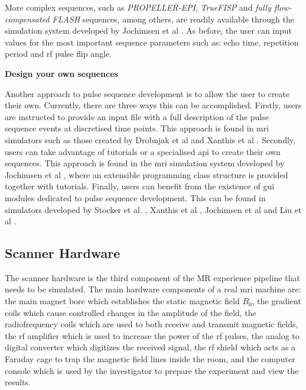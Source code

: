 \hfill

More complex sequences, such as \textit{PROPELLER-EPI}, \textit{TrueFISP} and \textit{fully flow-compensated FLASH} sequences, among others, are readily available through the simulation system developed by Jochimsen et al \cite{Jochimsen2004}.
As before, the user can input values for the most important sequence parameters such as: echo time, repetition period and \ac{rf} pulse flip angle.


\hfill

\large \textbf{Design your own sequences} \normalsize

Another approach to pulse sequence development is to allow the user to create their own.
Currently, there are three ways this can be accomplished.
Firstly, users are instructed to provide an input file with a full description of the pulse sequence events at discretised time points.
This approach is found in \ac{mri} simulators such as those created by Drobnjak et al \cite{Drobnjak2006} and Xanthis et al \cite{Xanthis2014}.
Secondly, users can take advantage of tutorials or a specialised \ac{api} to create their own sequences.
This approach is found in the \ac{mri} simulation system developed by Jochimsen et al \cite{Jochimsen2004}, where an extensible programming class structure is provided together with tutorials.
Finally, users can benefit from the existence of \ac{gui} modules dedicated to pulse sequence development.
This can be found in simulators developed by Stocker et al. \cite{Stocker2010}, Xanthis et al \cite{Xanthis2014}, Jochimsen et al \cite{Jochimsen2004} and Liu et al \cite{Liu2013}.

\hfill

\subsection{Scanner Hardware}

The scanner hardware is the third component of the MR experience pipeline that needs to be simulated.
The main hardware components of a real \ac{mri} machine are: 
the main magnet bore which establishes the static magnetic field $B_0$, 
the gradient coils which cause controlled changes in the amplitude of the field,
the radiofrequency coils which are used to both receive and transmit magnetic fields,
the \ac{rf} amplifier which is used to increase the power of the \ac{rf} pulses,
the analog to digital converter which digitizes the received signal,
the \ac{rf} shield which acts as a Faraday cage to trap the magnetic field lines inside the room, and
the computer console which is used by the investigator to prepare the experiment and view the results.

